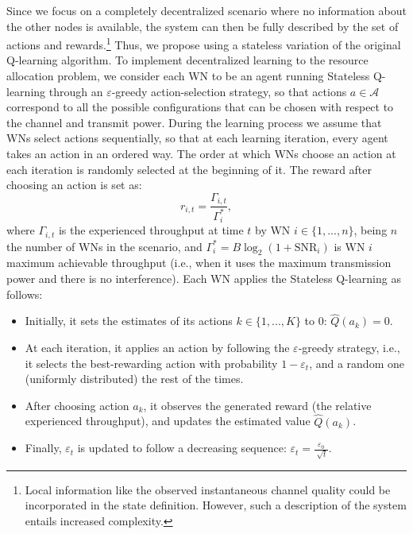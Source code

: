 \documentclass{article}
\begin{document}
	Since we focus on a completely decentralized scenario where no information about the other nodes is available, the system can then be fully described by the set of actions and rewards.\footnote{Local information like the observed instantaneous channel quality could be incorporated in the state definition. However, such a description of the system entails increased complexity.} Thus, we propose using a stateless variation of the original Q-learning algorithm. To implement decentralized learning to the resource allocation problem, we consider each WN to be an agent running Stateless Q-learning through an $\varepsilon$-greedy action-selection strategy, so that actions $a \in \mathcal{A}$ correspond to all the possible configurations that can be chosen with respect to the channel and transmit power. During the learning process we assume that WNs select actions sequentially, so that at each learning iteration, every agent takes an action in an ordered way. The order at which WNs choose an action at each iteration is randomly selected at the beginning of it. The reward after choosing an action is set as:
	\begin{equation}
	r_{i,t} = \frac{\Gamma_{i,t}}{\Gamma_i^*},
	\label{eq:reward_generation}
	\nonumber
	\end{equation}
	where $\Gamma_{i,t}$ is the experienced throughput at time $t$ by WN $i \in \{1,...,n\}$, being $n$ the number of WNs in the scenario, and $\Gamma_{i}^* = B \log_{2}(1 + \text{SNR}_{i})$ is WN $i$ maximum achievable throughput (i.e., when it uses the maximum transmission power and there is no interference).	Each WN applies the Stateless Q-learning as follows: 
	\begin{itemize}
		\item Initially, it sets the estimates of its actions $k \in \{1,...,K\}$ to 0: $\hat{Q}(a_k) = 0$.
		\item At each iteration, it applies an action by following the $\varepsilon$-greedy strategy, i.e., it selects the best-rewarding action with probability $1 - \varepsilon_t$, and a random one (uniformly distributed) the rest of the times.
		\item After choosing action $a_k$, it observes the generated reward (the relative experienced throughput), and updates the estimated value $\hat{Q}(a_k)$.
		\item Finally, $\varepsilon_t$ is updated to follow a decreasing sequence: $\varepsilon_t = \frac{\varepsilon_0}{\sqrt[]{t}}$.
	\end{itemize}	
\end{document}
